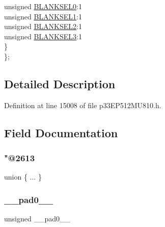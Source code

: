 \begin{DoxyCompactItemize}
\begin{tabbing}
\>\>unsigned \hyperlink{structtag_a_u_x_c_o_n4_b_i_t_s_ac11d96c4da7a19f8070237598aad5779}{BLANKSEL0}:1\\
\>\>unsigned \hyperlink{structtag_a_u_x_c_o_n4_b_i_t_s_a44677be7697055968c0df4a017937ad4}{BLANKSEL1}:1\\
\>\>unsigned \hyperlink{structtag_a_u_x_c_o_n4_b_i_t_s_aded93be63f6e5d719aa8cd84f125f650}{BLANKSEL2}:1\\
\>\>unsigned \hyperlink{structtag_a_u_x_c_o_n4_b_i_t_s_a9a435fdd957a6f0e1b6e67ea964df687}{BLANKSEL3}:1\\
\>\} \\
\}; \\

\end{tabbing}\end{DoxyCompactItemize}


\subsection{Detailed Description}


Definition at line 15008 of file p33\+E\+P512\+M\+U810.\+h.



\subsection{Field Documentation}
\mbox{\label{structtag_a_u_x_c_o_n4_b_i_t_s_a332d18de7ceedefb8c5af8ee0f8c5527}} 
\subsubsection{\texorpdfstring{"@2613}{@2613}}
{\footnotesize\ttfamily union \{ ... \} }

\mbox{\label{structtag_a_u_x_c_o_n4_b_i_t_s_adf71f3d8410c1f1dbbc96680a92c49af}} 
\subsubsection{\texorpdfstring{\+\_\+\+\_\+pad0\+\_\+\+\_\+}{\_\_pad0\_\_}}
{\footnotesize\ttfamily unsigned \+\_\+\+\_\+pad0\+\_\+\+\_\+}



